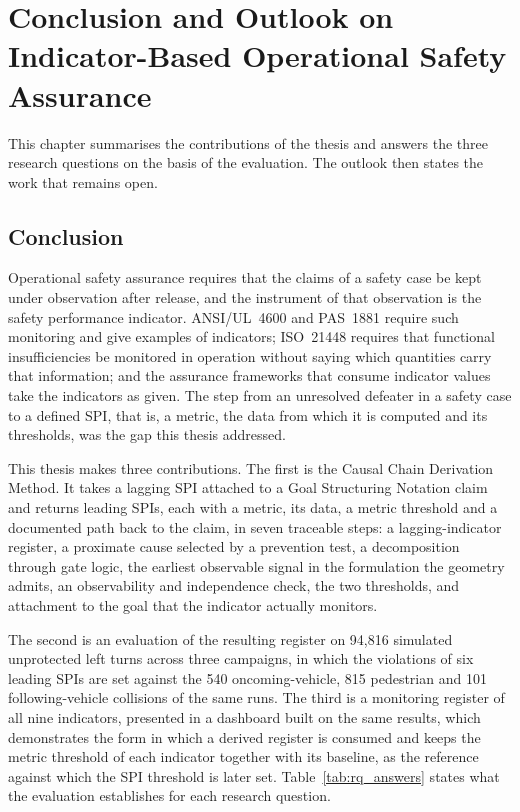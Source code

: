 \chapter[Conclusion and Outlook]{Conclusion and Outlook on Indicator-Based Operational Safety Assurance}
\label{ch:conclusion}

This chapter summarises the contributions of the thesis and answers the three
research questions on the basis of the evaluation. The outlook then states the work
that remains open.

\section{Conclusion}
\label{sec:conclusion}

Operational safety assurance requires that the claims of a safety case be kept
under observation after release, and the instrument of that observation is the
safety performance indicator. ANSI/UL~4600 \cite{ul4600} and PAS~1881
\cite{pas1881} require such monitoring and give examples of indicators;
ISO~21448 \cite{iso21448} requires that functional insufficiencies be monitored
in operation without saying which quantities carry that information; and the
assurance frameworks that consume indicator values take the indicators as given.
The step from an unresolved defeater in a safety case to a defined \ac{SPI}, that is, a
metric, the data from which it is computed and its thresholds, was the gap this thesis
addressed.

This thesis makes three contributions. The first is the Causal Chain Derivation
Method. It takes a lagging \ac{SPI} attached to a Goal Structuring Notation claim
and returns leading \acp{SPI}, each with a metric, its data, a metric threshold and a
documented path back to the claim, in
seven traceable steps: a lagging-indicator register, a proximate cause selected
by a prevention test, a decomposition through gate logic, the earliest observable
signal in the formulation the geometry admits, an observability and independence
check, the two thresholds, and attachment to the goal that the indicator actually
monitors.

The second is an evaluation of the resulting register on 94,816 simulated
unprotected left turns across three campaigns, in which the violations of six
leading SPIs are set against the 540 oncoming-vehicle, 815 pedestrian and
101 following-vehicle collisions of the same runs. The third is a monitoring register of all nine indicators, presented in a
dashboard built on the same results, which demonstrates the form in which a
derived register is consumed and keeps the metric threshold of each indicator
together with its baseline, as the reference against which the SPI threshold is
later set. Table~\ref{tab:rq_answers} states what the evaluation establishes for
each research question.

